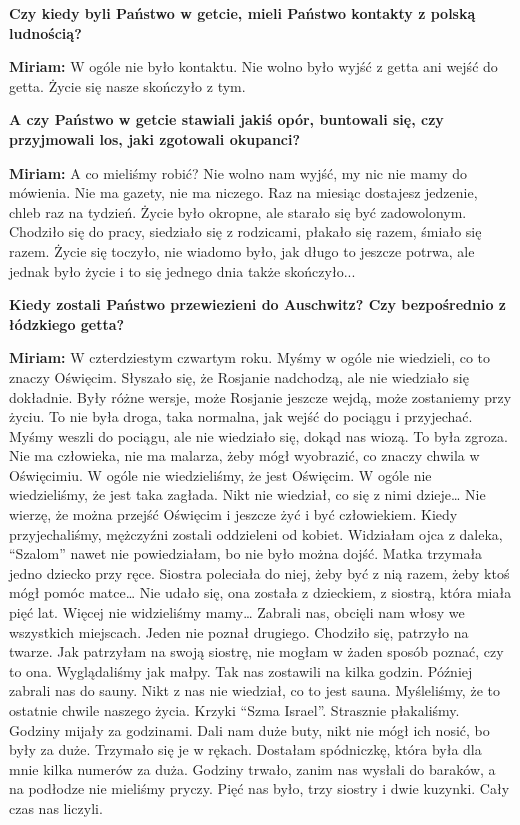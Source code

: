 \begin{otherlanguage}{polish}
\textbf{Czy kiedy byli Państwo w getcie, mieli Państwo kontakty z polską ludnością?} 

\textbf{Miriam:} W ogóle nie było kontaktu. Nie wolno było wyjść z getta ani wejść do getta. Życie się nasze skończyło z tym.

\textbf{A czy Państwo w getcie stawiali jakiś opór, buntowali się, czy przyjmowali los, jaki zgotowali okupanci?} 

\textbf{Miriam:} A co mieliśmy robić? Nie wolno nam wyjść, my nic nie mamy do mówienia. Nie ma gazety, nie ma niczego. Raz na miesiąc dostajesz jedzenie, chleb raz na tydzień. Życie było okropne, ale starało się być zadowolonym. Chodziło się do pracy, siedziało się z rodzicami, płakało się razem, śmiało się razem. Życie się toczyło, nie wiadomo było, jak długo to jeszcze potrwa, ale jednak było życie i to się jednego dnia także skończyło... 

\textbf{Kiedy zostali Państwo przewiezieni do Auschwitz? Czy bezpośrednio z łódzkiego getta? }

\textbf{Miriam:} W czterdziestym czwartym roku. Myśmy w ogóle nie wiedzieli, co to znaczy Oświęcim. Słyszało się, że Rosjanie nadchodzą, ale nie wiedziało się dokładnie. Były różne wersje, może Rosjanie jeszcze wejdą, może zostaniemy przy życiu. To nie była droga, taka normalna, jak wejść do pociągu i przyjechać. Myśmy weszli do pociągu, ale nie wiedziało się, dokąd nas wiozą. To była zgroza. Nie ma człowieka, nie ma malarza, żeby mógł wyobrazić, co znaczy chwila w Oświęcimiu. W ogóle nie wiedzieliśmy, że jest Oświęcim. W ogóle nie wiedzieliśmy, że jest taka zagłada. Nikt nie wiedział, co się z nimi dzieje… Nie wierzę, że można przejść Oświęcim i jeszcze żyć i być człowiekiem. Kiedy przyjechaliśmy, mężczyźni zostali oddzieleni od kobiet. Widziałam ojca z daleka, "`Szalom"' nawet nie powiedziałam, bo nie było można dojść. Matka trzymała jedno dziecko przy ręce. Siostra poleciała do niej, żeby być z nią razem, żeby ktoś mógł pomóc matce… Nie udało się, ona została z dzieckiem, z siostrą, która miała pięć lat. Więcej nie widzieliśmy mamy… Zabrali nas, obcięli nam włosy we wszystkich miejscach. Jeden nie poznał drugiego. Chodziło się, patrzyło na twarze. Jak patrzyłam na swoją siostrę, nie mogłam w żaden sposób poznać, czy to ona. Wyglądaliśmy jak małpy. Tak nas zostawili na kilka godzin. Później zabrali nas do sauny. Nikt z nas nie wiedział, co to jest sauna. Myśleliśmy, że to ostatnie chwile naszego życia. Krzyki "`Szma Israel"'. Strasznie płakaliśmy. Godziny mijały za godzinami. Dali nam duże buty, nikt nie mógł ich nosić, bo były za duże. Trzymało się je w rękach. Dostałam spódniczkę, która była dla mnie kilka numerów za duża. Godziny trwało, zanim nas wysłali do baraków, a na podłodze nie mieliśmy pryczy. Pięć nas było, trzy siostry i dwie kuzynki. Cały czas nas liczyli. 


\end{otherlanguage}
